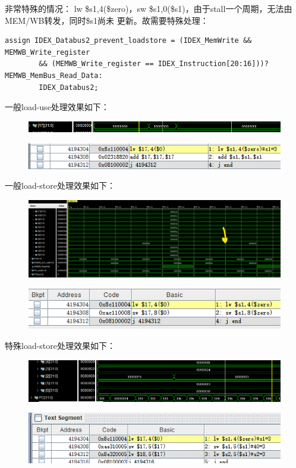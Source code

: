 \documentclass[10pt]{article}
\begin{document}
非常特殊的情况：
lw \$s1,4(\$zero)，sw \$s1,0(\$s1)，由于stall一个周期，无法由MEM/WB转发，同时\$s1尚未
更新。故需要特殊处理：
\begin{lstlisting}[style={verilog-style}]
    assign IDEX_Databus2_prevent_loadstore = (IDEX_MemWrite && MEMWB_Write_register
        && (MEMWB_Write_register == IDEX_Instruction[20:16]))? MEMWB_MemBus_Read_Data:
        IDEX_Databus2;
\end{lstlisting}
一般load-use处理效果如下：
\begin{figure}[H]
    \centering
    \includegraphics[scale=0.6]{add.png}
    \end{figure}
    \begin{figure}[H]
        \centering
        \includegraphics[scale=0.9]{addon.png}
        \end{figure}
一般load-store处理效果如下：
\begin{figure}[H]
    \centering
    \includegraphics[scale=0.4]{lstore.png}
    \end{figure}
    \begin{figure}[H]
        \centering
        \includegraphics[scale=0.9]{fo.png}
        \end{figure}
特殊load-store处理效果如下：
\begin{figure}[H]
    \centering
    \includegraphics[scale=0.5]{specialls.png}
    \end{figure}
\begin{figure}[H]
    \centering
    \includegraphics[scale=0.9]{hdl.png}
    \end{figure}
\end{document}
